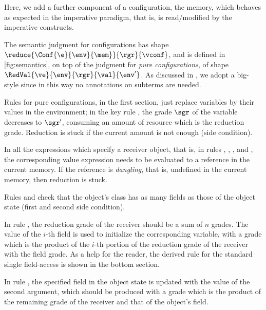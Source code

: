 Here, we add a further component of a configuration, the memory, which behaves as expected in the imperative paradigm, that is, is read/modified by the imperative constructs. 

The
semantic judgment for configurations has shape $\reduce{\Conf{\e}{\env}{\mem}}{\rgr}{\vconf}$, and is defined in \cref{fig:semantics}, on top of the judgment  for \emph{pure configurations}, of shape $\RedVal{\ve}{\env}{\rgr}{\val}{\env'}$. As discussed in \cite{BianchiniDGZ23oopsla}, we adopt a big-style since in this way no annotations on subterms are needed. 

Rules for  pure configurations, in the first section, just replace variables by their values in the environment; in the key rule , the grade $\sgr$ of the variable decreases to $\sgr'$, consuming an amount of resource which is the reduction grade. Reduction is stuck if the current amount is not enough (side condition). 


In all the expressions which specify a receiver object, that is, in rules , ,  , and , the corresponding value expression needs to be evaluated to a reference in the current memory. If the reference is \emph{dangling}, that is, undefined in the current memory, then reduction is stuck. 

\bez
Rules  and  check that the object's class has as many fields as those of the object state (first and second side condition).  

 In rule , the reduction grade of the receiver should be a sum of $n$ grades.
The value of the $i$-th field is used to initialize the corresponding variable, with a grade which is the product of the $i$-th portion of the reduction grade of the receiver with the field grade. As a help for the reader, the derived rule  for the standard single field-access is shown in the bottom section.

In rule ,
the specified field in the object state is updated with the value of the second argument, which should be produced with a grade which is the product of the remaining grade of the receiver and that of the object's field. 
\eez

